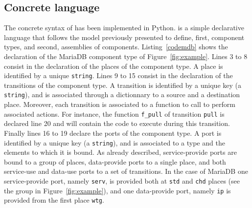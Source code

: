 
\subsection{Concrete language}

The concrete syntax of \mad has been implemented in Python. \mad is a
simple declarative language that follows the model previously
presented to define, first, component types, and second, assemblies of
components. Listing~\ref{codemdb} shows the declaration of the MariaDB
component type of Figure~\ref{fig:example}. Lines 3 to 8 consist in
the declaration of the places of the component type. A place is
identified by a unique \texttt{string}. Lines 9 to 15 consist in the
declaration of the transitions of the component type. A transition is
identified by a unique key (a \texttt{string}), and is associated
through a dictionnary to a source and a destination place. Moreover,
each transition is associated to a function to call to perform
associated actions. For instance, the function \texttt{f\_pull} of
transition \texttt{pull} is declared line 20 and will contain the code
to execute during this transition. Finally lines 16 to 19 declare the
ports of the component type. A port is identified by a unique key (a
\texttt{string}), and is associated to a type and the elements to
which it is bound. As already described, service-provide ports are
bound to a group of places, data-provide ports to a single place, and
both service-use and data-use ports to a set of transitions. In the
case of MariaDB one service-provide port, namely \texttt{serv}, is
provided both at \texttt{std} and \texttt{chd} places (see the group
in Figure~\ref{fig:example}), and one data-provide port, namely
\texttt{ip} is provided from the first place \texttt{wtg}.



